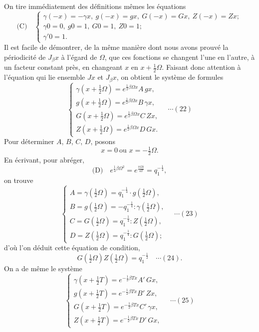 \documentclass[12pt,a4paper]{article}
\begin{document}
On tire imm\'ediatement des d\'efinitions m\^emes les \'equations
\[
\text{(C)}\quad
\begin{cases}
\gamma(-x) = -\gamma x,\ g(-x) = gx,\ G(-x) = Gx,\ Z(-x) = Zx;\\
\gamma 0 = 0,\ g 0 = 1,\ G 0 = 1,\ Z 0 = 1;\\
\gamma' 0 = 1.
\end{cases}
\]
Il est facile de d\'emontrer, de la m\^eme mani\`ere dont nous avons prouv\'e la p\'eriodicit\'e de $J_\beta x$ \`a l'\'egard de $\Omega$, que ces fonctions se changent l'une en l'autre, \`a un facteur constant pr\`es, en changeant $x$ en $x + \tfrac12\Omega$. Faisant donc attention \`a l'\'equation qui lie ensemble $Jx$ et $J_\beta x$, on obtient le syst\`eme de formules
\[
\begin{cases}
\gamma(x + \tfrac12\Omega) = e^{\frac12\beta\Omega x}A\,gx,\\
g(x + \tfrac12\Omega) = e^{\frac12\beta\Omega x}B\,\gamma x,\\
G(x + \tfrac12\Omega) = e^{\frac12\beta\Omega x}C\,Zx,\\
Z(x + \tfrac12\Omega) = e^{\frac12\beta\Omega x}D\,Gx.
\end{cases}
\quad\cdots(22)
\]
Pour d\'eterminer $A$, $B$, $C$, $D$, posons
\[
x = 0\ \text{ou } x = -\tfrac12\Omega.
\]
En \'ecrivant, pour abr\'eger,
\[
\text{(D)}\quad e^{\frac14\beta\Omega^2} = e^{\frac{\pi\Omega i}{4T}} = q_1^{-\frac14},
\]
on trouve
\[
\begin{cases}
A = \gamma(\tfrac12\Omega) = q_1^{-\frac14} \cdot g(\tfrac12\Omega),\\
B = g(\tfrac12\Omega) = -q_1^{-\frac14}\!:\!\gamma(\tfrac12\Omega),\\
C = G(\tfrac12\Omega) = q_1^{-\frac14}\!:\!Z(\tfrac12\Omega),\\
D = Z(\tfrac12\Omega) = q_1^{-\frac14}\!:\!G(\tfrac12\Omega);
\end{cases}
\quad\cdots(23)
\]
d'o\`u l'on d\'eduit cette \'equation de condition,
\[
G(\tfrac12\Omega)Z(\tfrac12\Omega) = q_1^{-\frac12} \quad\cdots(24).
\]
On a de m\^eme le syst\`eme
\[
\begin{cases}
\gamma(x + \tfrac12 T) = e^{-\frac12\beta Tx}A'\,Gx,\\
g(x + \tfrac12 T) = e^{-\frac12\beta Tx}B'\,Zx,\\
G(x + \tfrac12 T) = e^{-\frac12\beta Tx}C'\,\gamma x,\\
Z(x + \tfrac12 T) = e^{-\frac12\beta Tx}D'\,Gx,
\end{cases}
\quad\cdots(25)
\]
\end{document}

